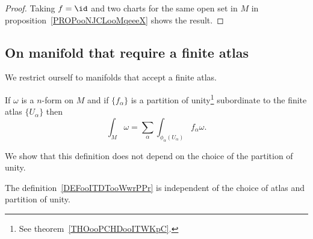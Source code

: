 \begin{proof}
	Taking \( f=\id\) and two charts for the same open set in \( M\) in proposition~\ref{PROPooNJCLooMqeeeX} shows the result.
\end{proof}

\subsection{On manifold that require a finite atlas}

We restrict ourself to manifolds that accept a finite atlas.

\begin{definition}      \label{DEFooITDTooWwrPPr}
	If \( \omega\) is a \( n\)-form on \( M\) and if \( \{ f_{\alpha} \} \) is a partition of unity\footnote{See theorem~\ref{THOooPCHDooITWKpC}.} subordinate to the finite atlas \( \{ U_{\alpha} \}\) then
	\begin{equation}
		\int_M\omega=\sum_{\alpha}\int_{\phi_{\alpha}(U_{\alpha})}f_{\alpha}\omega.
	\end{equation}
\end{definition}

We show that this definition does not depend on the choice of the partition of unity.
\begin{lemma} \label{LEMooCMIZooHhHaHV}
	The definition~\ref{DEFooITDTooWwrPPr} is independent of the choice of atlas and partition of unity.
\end{lemma}

